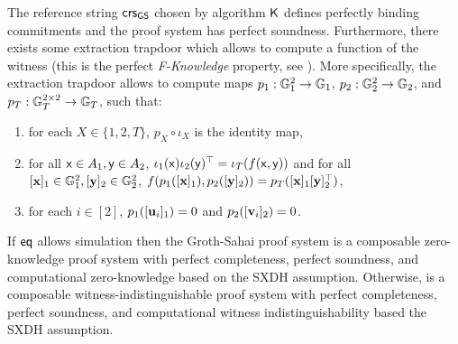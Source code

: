 The reference string $\mathsf{crs}_{\mathsf{GS}}$ chosen by algorithm $\mathsf{K}$ defines perfectly binding commitments and the proof system has perfect soundness. Furthermore, there exists some extraction trapdoor which allows to compute a function of the witness (this is the perfect \emph{F-Knowledge} property, see \cite{PKC:EscGro14}). More specifically, the extraction trapdoor
allows to compute maps $p_1: \mathbb{G}_1^2\to \mathbb{G}_1$, $p_2:\mathbb{G}_2^2 \to \mathbb{G}_2$, and $p_T:\mathbb{G}_T^{2 \times 2} \to  \mathbb{G}_T$, such that:
\begin{enumerate}[label=(\alph*)]
\item for each $X\in\{1,2,T\}$, $p_X\circ\iota_X$ is the identity map,
\item for all $\mathsf{x}\in A_1,\mathsf{y}\in A_2$, $\iota_1(\mathsf{x})\iota_2(\mathsf{y})^\top = \iota_T(f(\mathsf{x},\mathsf{y}))$ and for all $[\mathbf{x}]_1\in\mathbb{G}_1^2,[\mathbf{y}]_2\in\mathbb{G}_2^2$,
$f(p_1([\mathbf{x}]_1),p_2([\mathbf{y}]_2))=p_T([\mathbf{x}]_1[\mathbf{y}]_2^\top)$,
\item for each $i\in[2]$, $p_1([\mathbf{u}_i]_1)=0$ and $p_2([\mathbf{v}_i]_2)=0$.
\end{enumerate}

\begin{theorem} If $\mathsf{eq}$ allows simulation then the Groth-Sahai proof system is a composable zero-knowledge proof system with perfect completeness, perfect soundness, and computational zero-knowledge based on the SXDH assumption. Otherwise, is a composable witness-indistinguishable proof system with perfect completeness, perfect soundness, and computational witness indistinguishability based the SXDH assumption.
\end{theorem}

